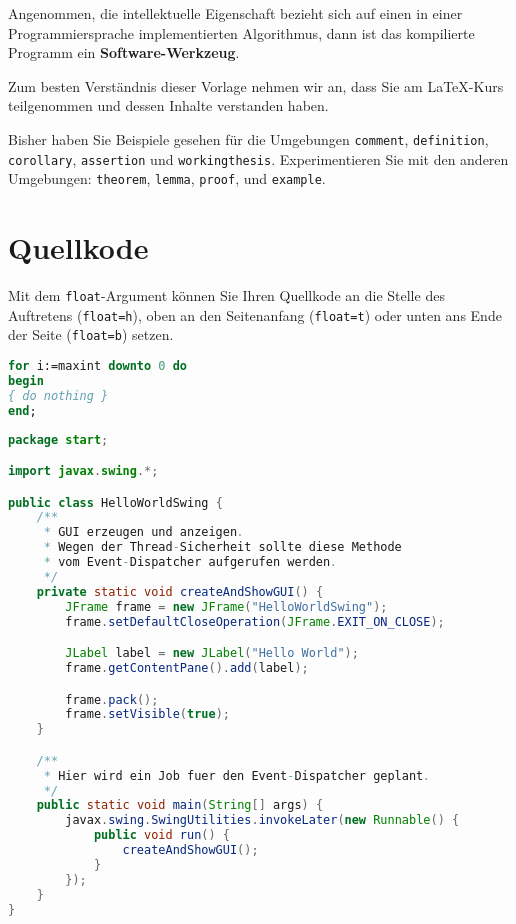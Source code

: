\begin{corollary}\label{Cor:WoftwareTool}
	Angenommen, die intellektuelle Eigenschaft bezieht sich auf einen in einer Programmiersprache implementierten Algorithmus, dann ist das kompilierte Programm ein \textbf{Software-Werkzeug}.
\end{corollary}

\begin{assertion}
	Zum besten Verständnis dieser Vorlage nehmen wir an, dass Sie am \LaTeX{}-Kurs teilgenommen und dessen Inhalte verstanden haben.
\end{assertion}

Bisher haben Sie Beispiele gesehen für die Umgebungen \texttt{comment}, \texttt{definition}, \texttt{corollary}, \texttt{assertion} und \texttt{workingthesis}. Experimentieren Sie mit den anderen Umgebungen: \texttt{theorem}, \texttt{lemma}, \texttt{proof}, und \texttt{example}.

\clearpage
\section{Quellkode}\label{sec:apdx:Listings}
Mit dem \texttt{float}-Argument können Sie Ihren Quellkode an die Stelle des Auftretens (\texttt{float=h}), oben an den Seitenanfang (\texttt{float=t}) oder unten ans Ende der Seite (\texttt{float=b}) setzen.
\begin{lstlisting}[float=h,language=Pascal,frame=tb,caption={Beispielkode (Pascal)},label=lst:uselessPascal]
for i:=maxint downto 0 do
begin
{ do nothing }
end;
\end{lstlisting}

\begin{lstlisting}[float=h,language=Java,frame=tb,caption={Beispielkode (Java Swing)},label=lst:uselessJava]
package start;

import javax.swing.*;        

public class HelloWorldSwing {
    /**
     * GUI erzeugen und anzeigen.
     * Wegen der Thread-Sicherheit sollte diese Methode
     * vom Event-Dispatcher aufgerufen werden.
     */
    private static void createAndShowGUI() {
        JFrame frame = new JFrame("HelloWorldSwing");
        frame.setDefaultCloseOperation(JFrame.EXIT_ON_CLOSE);

        JLabel label = new JLabel("Hello World");
        frame.getContentPane().add(label);

        frame.pack();
        frame.setVisible(true);
    }

    /**
     * Hier wird ein Job fuer den Event-Dispatcher geplant.
     */
    public static void main(String[] args) {
        javax.swing.SwingUtilities.invokeLater(new Runnable() {
            public void run() {
                createAndShowGUI();
            }
        });
    }
}
\end{lstlisting}